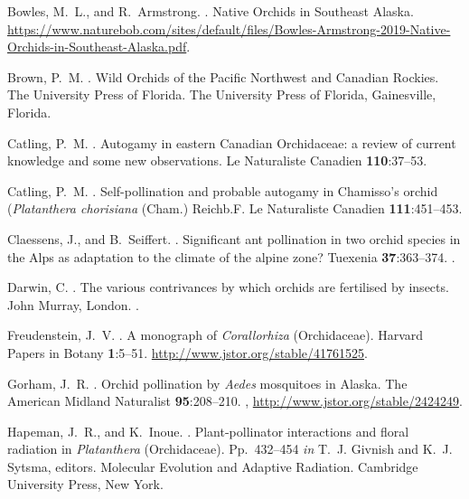 \begin{multicols}{2}
\begin{thebibliography}{27}
Bowles, M.~L., and R.~Armstrong.
.
\newblock Native Orchids in Southeast Alaska.
\newblock
  \urlprefix\url{https://www.naturebob.com/sites/default/files/Bowles-Armstrong-2019-Native-Orchids-in-Southeast-Alaska.pdf}.

Brown, P.~M.
.
\newblock Wild Orchids of the Pacific Northwest and Canadian Rockies. The
  University Press of Florida.
\newblock The University Press of Florida, Gainesville, Florida.

Catling, P.~M.
.
\newblock Autogamy in eastern Canadian Orchidaceae: a review of current
  knowledge and some new observations.
\newblock Le Naturaliste Canadien {\bfseries 110}:37--53.

Catling, P.~M.
.
\newblock Self-pollination and probable autogamy in Chamisso's orchid
  (\emph{Platanthera chorisiana} (Cham.) Reichb.F.
\newblock Le Naturaliste Canadien {\bfseries 111}:451--453.

Claessens, J., and B.~Seiffert.
.
\newblock Significant ant pollination in two orchid species in the Alps as
  adaptation to the climate of the alpine zone?
\newblock Tuexenia {\bfseries 37}:363--374.
\newblock {}.

Darwin, C.
.
\newblock The various contrivances by which orchids are fertilised by insects.
\newblock John Murray, London.
\newblock {}.

Freudenstein, J.~V.
.
\newblock A monograph of \emph{Corallorhiza} (Orchidaceae).
\newblock Harvard Papers in Botany {\bfseries 1}:5--51.
\newblock \urlprefix\url{http://www.jstor.org/stable/41761525}.

Gorham, J.~R.
.
\newblock Orchid pollination by \emph{Aedes} mosquitoes in {Alaska}.
\newblock The American Midland Naturalist {\bfseries 95}:208--210.
\newblock {},
  \urlprefix\url{http://www.jstor.org/stable/2424249}.

Hapeman, J.~R., and K.~Inoue.
.
\newblock Plant-pollinator interactions and floral radiation in
  \textit{Platanthera} (Orchidaceae).
\newblock Pp.\ 432--454 {\em in\/} T.~J. Givnish and K.~J. Sytsma, editors.
  Molecular Evolution and Adaptive Radiation. Cambridge University Press, New
  York.


\end{thebibliography}
\end{multicols}

